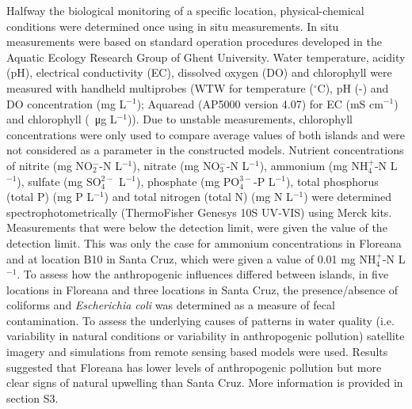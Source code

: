 Halfway the biological monitoring of a specific location, physical-chemical conditions were determined once using in situ measurements. In situ measurements were based on standard operation procedures developed in the Aquatic Ecology Research Group of Ghent University. Water temperature, acidity (pH), electrical conductivity (EC), dissolved oxygen (DO) and chlorophyll were measured with handheld multiprobes (WTW for temperature ($^{\circ}$C), pH (-) and DO concentration (mg L$^{-1}$); Aquaread (AP5000 version 4.07) for EC (mS cm$^{-1}$) and chlorophyll (\SI{}{\micro\gram} L$^{-1}$)). Due to unstable measurements, chlorophyll concentrations were only used to compare average values of both islands and were not considered as a parameter in the constructed models. Nutrient concentrations of nitrite (mg NO$_{2}^{-}$-N L$^{-1}$), nitrate (mg NO$_{3}^{-}$-N L$^{-1}$), ammonium (mg NH$_{4}^{+}$-N L$^{-1}$), sulfate (mg SO$_{4}^{2-}$ L$^{-1}$), phosphate (mg PO$_{4}^{3-}$-P L$^{-1}$), total phosphorus (total P) (mg P L$^{-1}$) and total nitrogen (total N) (mg N L$^{-1}$) were determined spectrophotometrically (ThermoFisher Genesys 10S UV‐VIS) using Merck kits. Measurements that were below the detection limit, were given the value of the detection limit. This was only the case for ammonium concentrations in Floreana and at location B10 in Santa Cruz, which were given a value of 0.01 mg NH$_{4}^{+}$-N L$^{-1}$. To assess how the anthropogenic influences differed between islands, in five locations in Floreana and three locations in Santa Cruz, the presence/absence of coliforms and \textit{Escherichia coli} was determined as a measure of fecal contamination. To assess the underlying causes of patterns in water quality (i.e. variability in natural conditions or variability in anthropogenic pollution) satellite imagery and simulations from remote sensing based models were used. Results suggested that Floreana has lower levels of anthropogenic pollution but more clear signs of natural upwelling than Santa Cruz. More information is provided in section S3. 


